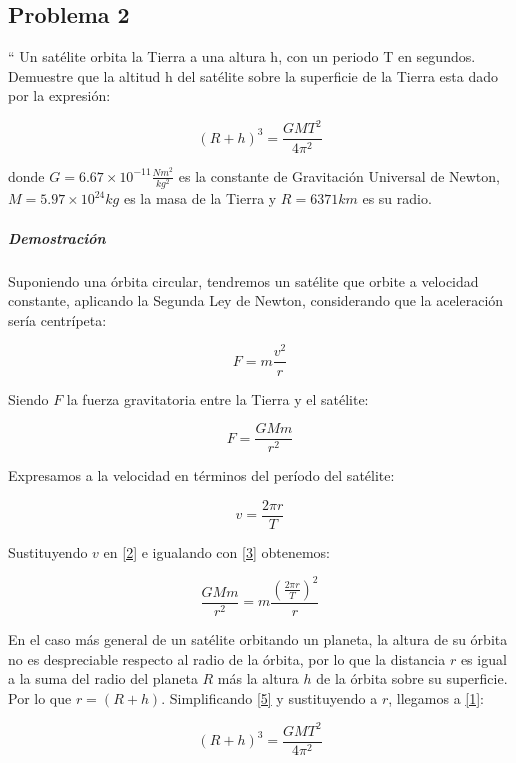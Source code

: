 \documentclass[12pt]{article}
\begin{document}
\subsection{Problema 2}

`` Un satélite orbita la Tierra a una altura h, con un periodo T en segundos.
Demuestre que la altitud h del satélite sobre la superficie de la Tierra esta dado por la expresión:

\begin{equation} \label{1}
(R+h)^3=\frac{GMT^2}{4\pi^2}
\end{equation}

donde $G = 6.67\times10^{-11} \frac{Nm^2}{kg^2} $ es la constante de Gravitación Universal de Newton, $M = 5.97 \times 10^{24} kg$ es la masa de la Tierra y $R=6371 km$ es su radio.

\subparagraph*{Demostración}
Suponiendo una órbita circular, tendremos un satélite que orbite a velocidad constante, aplicando la Segunda Ley de Newton, considerando que la aceleración sería centrípeta:

\begin{equation} \label{2}
F=m\frac{v^2}{r}
\end{equation}

Siendo $F$ la fuerza gravitatoria entre la Tierra y el satélite:

\begin{equation} \label{3}
F=\frac{GMm}{r^2}
\end{equation}

Expresamos a la velocidad en términos del período del satélite:

\begin{equation} \label{4}
v=\frac{2\pi r}{T}
\end{equation}

Sustituyendo $v$ en \eqref{2} e igualando con \eqref{3} obtenemos:

\begin{equation} \label{5}
\frac{GMm}{r^2}=m\frac{{(\frac{2\pi r}{T})}^2}{r}
\end{equation}

En el caso más general de un satélite orbitando un planeta, la altura de su órbita no es despreciable respecto al radio de la órbita, por lo que la distancia $r$ es igual a la suma del radio del planeta $R$ más la altura $h$ de la órbita sobre su superficie. Por lo que $r=(R+h)$. Simplificando \eqref{5} y sustituyendo a $r$, llegamos a \eqref{1}:

\begin{equation}
(R+h)^3=\frac{GMT^2}{4\pi^2}
\end{equation}
\end{document}
